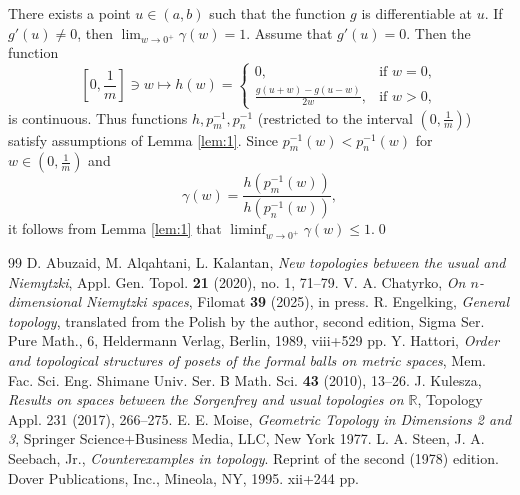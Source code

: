 \documentclass[a4paper,12pt,leqno]{amsart}
\theoremstyle{definition}
\renewcommand{\leq}{\leqslant}
\begin{document}
There exists a point $u\in (a,b)$ such that the function $g$ is differentiable at $u$.
          If $g'(u)\neq 0$, then $\lim_{w\to 0^+}\gamma(w)=1$.
          Assume that $g'(u)=0$.
Then the function
$$\textstyle [0,\frac1m]\ni w\mapsto h(w)=
\begin{cases}
  0,&\mbox{if }w=0,\\
  \frac{g(u+w)-g(u-w)}{2w},&\mbox{if }w>0,
\end{cases}$$
is continuous.
Thus functions $h,p_m^{-1},p_n^{-1}$ (restricted to the interval $(0,\frac1m)$) satisfy assumptions of Lemma \ref{lem:1}.
Since $p_m^{-1}(w)<p_n^{-1}(w)$ for $w\in (0,\frac1m)$ and
$$\gamma(w)=\frac{h(p_m^{-1}(w))}{h(p_n^{-1}(w))},$$
it follows from Lemma  \ref{lem:1} that $\liminf_{w\to 0^+}\gamma(w)\leq 1$.\qed

\begin{thebibliography}{99}
   D. Abuzaid, M. Alqahtani, L. Kalantan, \emph{New topologies between the usual and Niemytzki}, Appl. Gen. Topol. \textbf{21} (2020), no. 1, 71--79.
   V. A. Chatyrko, \emph{On $n$-dimensional Niemytzki spaces}, Filomat \textbf{39} (2025), in press.
   R. Engelking, \emph{General topology}, translated from the Polish by the author, second edition, Sigma Ser. Pure Math., 6, Heldermann Verlag, Berlin, 1989, viii+529 pp.
     Y. Hattori, \emph{Order and topological structures of posets of the formal balls on metric spaces}, Mem. Fac. Sci. Eng. Shimane Univ. Ser. B Math. Sci. \textbf{43} (2010), 13--26.
   J. Kulesza, \emph{Results on spaces between the Sorgenfrey and usual topologies on $\mathbb{R}$}, Topology Appl. 231 (2017), 266--275.
   E. E. Moise, \emph{Geometric Topology in Dimensions 2 and 3}, Springer Science+Business Media, LLC, New York 1977.
     L. A. Steen, J. A. Seebach, Jr., \emph{Counterexamples in topology}. Reprint of the second (1978) edition. Dover Publications, Inc., Mineola, NY, 1995. xii+244 pp.
\end{thebibliography}
\end{document}
